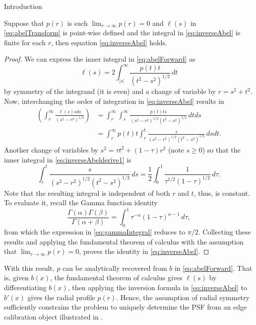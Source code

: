 \begin{chapter}{Introduction}
  \begin{prop}
    Suppose that $p(r)$ is such $\lim_{r\to\infty}p(r) = 0$ and $\ell(s)$ in \eqref{eq:abelTransform} is point-wise defined and the integral in \eqref{eq:inverseAbel} is finite for each $r$, then equation \eqref{eq:inverseAbel} holds.
  \end{prop}
  \begin{proof}
  We can express the inner integral in \eqref{eq:abelForward} as
  \begin{equation}
    \ell(s) = 2\int_{|s|}^\infty \frac{p(t) t}{(t^2 - s^2)^{1/2}}\,dt \label{eq:abelForward2}
  \end{equation}
  by symmetry of the integrand (it is even) and a change of variable by $r = s^2 + t^2$.
  Now, interchanging the order of integration in \eqref{eq:inverseAbel} results in
  \begin{align} 
    \left(\int_r^\infty \frac{\ell(s) s ds}{ (s^2 - r^2)^{1/2} } \right)  
    &= \int_r^\infty\int_s^\infty \frac{p(t) ts}{(s^2 - r^2)^{1/2}(t^2 - s^2)^{1/2}}\,dtds \nonumber\\
    &= \int_r^\infty p(t) t\int_r^t \frac{s}{(s^2 - r^2)^{1/2}(t^2 - s^2)^{1/2}}\,dsdt. \label{eq:inverseAbelderive1}
  \end{align} 
  Another change of variables by $s^2 = \tau t^2 + (1-\tau)r^2$ (note $s\ge0$)
  so that the inner integral in \eqref{eq:inverseAbelderive1} is
  \begin{equation}
    \int_r^t \frac{s}{(s^2 - r^2)^{1/2}(t^2 - s^2)^{1/2}}\,ds
    = \frac 12 \int_0^1 \frac {1}{\tau^{1/2}(1-\tau)^{1/2}}\,d\tau. \label{eq:gammaIntegral}
  \end{equation}
  Note that the resulting integral is independent of both $r$ and $t$, thus, is constant. To evaluate it, recall the Gamma function identity
  \begin{equation} 
    \frac{\Gamma(\alpha)\Gamma(\beta)}{\Gamma(\alpha + \beta)} = \int_0^1 \tau^{-\alpha}(1-\tau)^{\alpha -1}\,d\tau,
  \end{equation}
  from which the expression in \eqref{eq:gammaIntegral} reduces to $\pi/2$.
  Collecting these results and applying the fundamental theorem of calculus with the assumption that $\lim_{r\to\infty}p(r) = 0$, proves the identity in \eqref{eq:inverseAbel}.
\end{proof}
  
  With this result, $p$ can be analytically recovered from $b$ in \eqref{eq:abelForward}. 
  That is, given $b(x)$, the fundamental theorem of calculus gives $\ell(s)$ by differentiating $b(x)$, then applying the inversion formula in \eqref{eq:inverseAbel} to $b'(x)$ gives the radial profile $p(r)$.
  Hence, the assumption of radial symmetry sufficiently constrains the problem to uniquely determine the PSF from an edge calibration object illustrated in .


\end{chapter}
